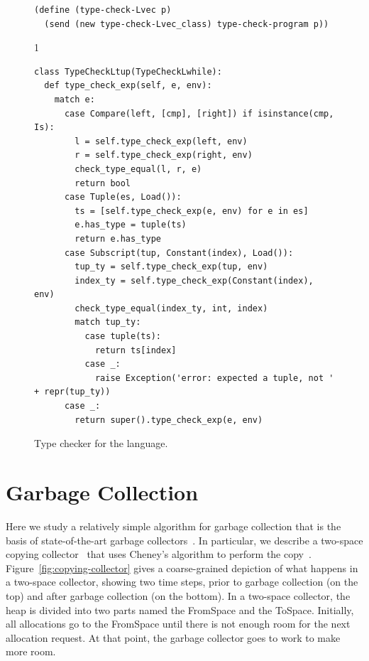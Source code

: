 \documentclass[7x10]{TimesAPriori_MIT}%
\def\pythonEd{1}
\def\edition{1}
\begin{document}
\begin{figure}[tp]
{\begin{lstlisting}[basicstyle=\ttfamily\scriptsize]
(define (type-check-Lvec p)
  (send (new type-check-Lvec_class) type-check-program p))
\end{lstlisting}
\fi}
{\if\edition\pythonEd
\begin{lstlisting}
class TypeCheckLtup(TypeCheckLwhile):
  def type_check_exp(self, e, env):
    match e:
      case Compare(left, [cmp], [right]) if isinstance(cmp, Is):
        l = self.type_check_exp(left, env)
        r = self.type_check_exp(right, env)
        check_type_equal(l, r, e)
        return bool
      case Tuple(es, Load()):
        ts = [self.type_check_exp(e, env) for e in es]
        e.has_type = tuple(ts)
        return e.has_type
      case Subscript(tup, Constant(index), Load()):
        tup_ty = self.type_check_exp(tup, env)
        index_ty = self.type_check_exp(Constant(index), env)
        check_type_equal(index_ty, int, index)
        match tup_ty:
          case tuple(ts):
            return ts[index]
          case _:
            raise Exception('error: expected a tuple, not ' + repr(tup_ty))
      case _:
        return super().type_check_exp(e, env)
\end{lstlisting}
\fi}
\caption{Type checker for the \LangVec{} language.}
\label{fig:type-check-Lvec}
\end{figure}


\section{Garbage Collection}
\label{sec:GC}

Here we study a relatively simple algorithm for garbage collection
that is the basis of state-of-the-art garbage
collectors~\citep{Lieberman:1983aa,Ungar:1984aa,Jones:1996aa,Detlefs:2004aa,Dybvig:2006aa,Tene:2011kx}. In
particular, we describe a two-space copying
collector~\citep{Wilson:1992fk} that uses Cheney's algorithm to
perform the
copy~\citep{Cheney:1970aa}.
Figure~\ref{fig:copying-collector} gives a
coarse-grained depiction of what happens in a two-space collector,
showing two time steps, prior to garbage collection (on the top) and
after garbage collection (on the bottom). In a two-space collector,
the heap is divided into two parts named the FromSpace and the
ToSpace. Initially, all allocations go to the FromSpace until there is
not enough room for the next allocation request. At that point, the
garbage collector goes to work to make more room.
\end{document}
